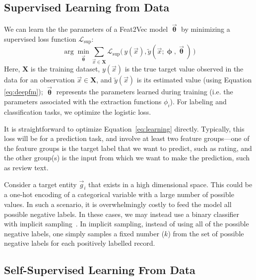 \documentclass[letterpaper]{article}
\newcommand{\vect}[1]{\vec{#1}}
\begin{document}
\subsection{Supervised Learning from Data}
\label{sec:learning_supervised}

We can learn the the parameters of a Feat2Vec model $  \vect{\bm\uptheta}$  by minimizing a supervised loss function $\mathcal L_\text{sup}$:
\label{sec:learning}
\begin{equation}
\arg \min_{ \vect{\bm\uptheta}} \sum_{\vect{x} \in \mathbf{X}}  \mathcal{L}_\text{sup}\bigl( \, y(\vect{x}), \tilde y(\vect{x};{\bm \upphi,  \vect{\bm\uptheta}}) \, \bigr)
\label{eq:learning}
\end{equation}
Here, $\mathbf X$ is the training dataset, $y(\vect{x})$  is the true target value observed in the data for an observation $\vect{x} \in \mathbf{X}$, and $\tilde {y}(\vect{x})$ is its estimated value (using Equation \ref{eq:deepfm});
$ \vect{\bm\uptheta}$ represents the parameters learned  during training (i.e. the parameters associated with the extraction functions $\phi_i$).
For labeling and classification tasks, we optimize the logistic loss.

It is straightforward to optimize Equation~\ref{eq:learning} directly.
Typically, this loss will be for a prediction task, and involve at least two feature groups---one of the feature groups is the target label that we want to predict, such as rating, and the other group(s) is the input from which we want to make the prediction, such as review text.

Consider a target entity $\vect{g}_i$ that exists in a high dimensional space.
This could be a one-hot encoding of a categorical variable with a large number of possible values.
In such a scenario, it is overwhelmingly costly to feed the model all possible negative labels.
In these cases, we may instead use a binary classifier with implicit sampling~\cite{samplingnotes}.
In implicit sampling, instead of using all of the possible negative labels, one simply samples a fixed number ($k$) from the set of possible negative labels for each positively labelled record.

\subsection{Self-Supervised Learning From Data}
\label{sec:sampling}
\end{document}
